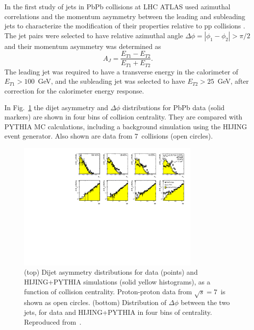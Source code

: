In the first study of jets in PbPb collisions at LHC ATLAS used azimuthal correlations and the 
momentum asymmetry between the leading and subleading jets to characterize the modification
of their properties relative to pp collisions \cite{Aad:2010bu}.
The jet pairs were selected to have relative azimuthal angle $\Delta \phi =|\phi_1-\phi_2| > \pi/2$
and their momentum asymmetry was determined as
\begin{equation}
A_J = \frac{E_{T1}-E_{T2}}{E_{T1}+E_{T2}}.
\end{equation}
The leading jet was required to have a transverse energy in the calorimeter of $E_{T1} > 100$~GeV,
and the subleading jet was selected to have $E_{T2} > 25$~GeV, after correction for 
the calorimeter energy response. 

In Fig.~\ref{fig:GR:final_4x2} the dijet asymmetry and $\Delta\phi$ distributions for PbPb data (solid markers) 
are shown in four bins of collision centrality. They are compared with PYTHIA MC calculations, including a 
background simulation using the HIJING event generator. Also shown are data from 7\TeV\
\pp collisions (open circles).
\begin{figure}[thb]
\begin{center}
\includegraphics[width=0.8\textwidth]{jetfigures/final_4x2_23_newpp.pdf}
\caption{
(top) Dijet asymmetry distributions for data (points) and HIJING+PYTHIA simulations (solid yellow histograms),
as a function of collision centrality.  Proton-proton data from $\sqrt{s}=7$\TeV\ is shown as open circles.
(bottom) Distribution of $\Delta\phi$ between the two jets, for data and HIJING+PYTHIA in four bins of centrality.
Reproduced from~\cite{Aad:2010bu}.}
\label{fig:GR:final_4x2}
\end{center}
\end{figure}

